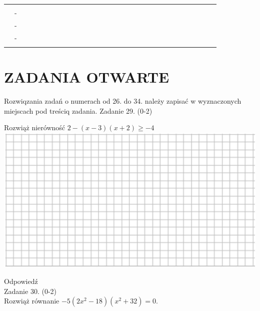 \documentclass[10pt]{article}
\begin{document}
\begin{center}
\begin{tabular}{|c|c|c|c|c|c|c|c|c|c|c|c|c|c|c|c|c|c|c|c|c|c|c|c|c|c|c|c|c|c|}
\hline
 &  &  &  &  &  &  &  &  &  &  &  &  &  &  &  &  &  &  &  &  &  &  &  &  &  &  &  &  &  \\
\hline
 &  &  &  &  &  &  &  &  &  &  &  &  &  &  &  &  &  &  &  &  &  &  &  &  &  &  &  &  &  \\
\hline
 & - &  &  &  &  &  &  &  &  &  &  &  &  &  &  &  &  &  &  &  &  &  &  &  &  &  &  &  &  \\
\hline
 & - &  &  &  &  &  &  &  &  &  &  &  &  &  &  &  &  &  &  &  &  &  &  &  &  &  &  &  &  \\
\hline
 & - &  &  &  &  &  &  &  &  &  &  &  &  &  &  &  &  &  &  &  &  &  &  &  &  &  &  &  &  \\
\hline
 &  &  &  &  &  &  &  &  &  &  &  &  &  &  &  &  &  &  &  &  &  &  &  &  &  &  &  &  &  \\
\hline
\end{tabular}
\end{center}

\section*{ZADANIA OTWARTE}
Rozwiqzania zadań o numerach od 26. do 34. należy zapisać w wyznaczonych miejscach pod treściq zadania. Zadanie 29. (0-2)

Rozwiąż nierówność \(2-(x-3)(x+2) \geq-4\)\\
\includegraphics[max width=\textwidth, center]{2024_11_21_fd555512e32c497e8a5dg-14}

Odpowiedź\\
Zadanie 30. (0-2)\\
Rozwiąż równanie \(-5\left(2 x^{2}-18\right)\left(x^{2}+32\right)=0\).
\end{document}
